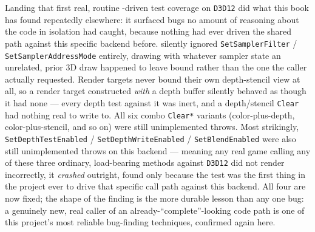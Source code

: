 Landing that first real, routine -driven test coverage on \texttt{D3D12}
did what this book has found repeatedly elsewhere: it surfaced bugs no amount of reasoning about
the code in isolation had caught, because nothing had ever driven the shared
 path against this specific backend before. 
silently ignored \texttt{SetSamplerFilter} / \texttt{SetSamplerAddressMode} entirely, drawing with
whatever sampler state an unrelated, prior 3D draw happened to leave bound rather than the one the
caller actually requested. Render targets never bound their own depth-stencil view at all, so a
render target constructed \emph{with} a depth buffer silently behaved as though it had none ---
every depth test against it was inert, and a depth/stencil \texttt{Clear} had nothing real to
write to. All six combo \texttt{Clear*} variants (color-plus-depth, color-plus-stencil, and so on)
were still unimplemented throws. Most strikingly, \texttt{SetDepthTestEnabled} /
\texttt{SetDepthWriteEnabled} / \texttt{SetBlendEnabled} were also still unimplemented throws on
this backend --- meaning any real game calling any of these three ordinary, load-bearing
 methods against \texttt{D3D12} did not render incorrectly, it
\emph{crashed} outright, found only because the  test was the first thing in the
project ever to drive that specific call path against this backend. All four are now fixed; the
shape of the finding is the more durable lesson than any one bug: a genuinely new, real caller of
an already-``complete''-looking code path is one of this project's most reliable bug-finding
techniques, confirmed again here.

